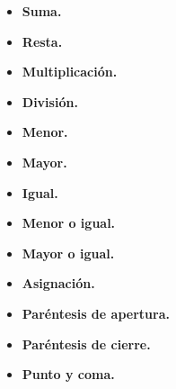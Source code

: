 \begin{itemize}
    \item \textbf{Suma.}
    \item \textbf{Resta.}
    \item \textbf{Multiplicación.}
    \item \textbf{División.}
    \item \textbf{Menor.}
    \item \textbf{Mayor.}
    \item \textbf{Igual.}
    \item \textbf{Menor o igual.}
    \item \textbf{Mayor o igual.}
    \item \textbf{Asignación.}
    \item \textbf{Paréntesis de apertura.}
    \item \textbf{Paréntesis de cierre.}
    \item \textbf{Punto y coma.}
\end{itemize}
